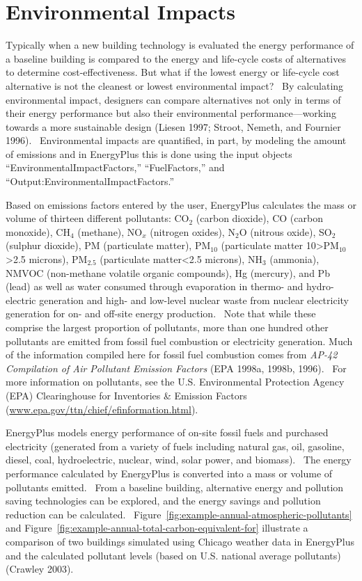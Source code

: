 \section{Environmental Impacts}\label{environmental-impacts}

Typically when a new building technology is evaluated the energy performance of a baseline building is compared to the energy and life-cycle costs of alternatives to determine cost-effectiveness. But what if the lowest energy or life-cycle cost alternative is not the cleanest or lowest environmental impact?~ By calculating environmental impact, designers can compare alternatives not only in terms of their energy performance but also their environmental performance---working towards a more sustainable design (Liesen 1997; Stroot, Nemeth, and Fournier 1996).~ Environmental impacts are quantified, in part, by modeling the amount of emissions and in EnergyPlus this is done using the input objects ``EnvironmentalImpactFactors,'' ``FuelFactors,'' and ``Output:EnvironmentalImpactFactors.''

Based on emissions factors entered by the user, EnergyPlus calculates the mass or volume of thirteen different pollutants: CO\(_{2}\) (carbon dioxide), CO (carbon monoxide), CH\(_{4}\) (methane), NO\(_{x}\) (nitrogen oxides), N\(_{2}\)O (nitrous oxide), SO\(_{2}\) (sulphur dioxide), PM (particulate matter), PM\(_{10}\) (particulate matter 10\textgreater{}PM\(_{10}\)\textgreater{}2.5 microns), PM\(_{2.5}\) (particulate matter\textless{}2.5 microns), NH\(_{3}\) (ammonia), NMVOC (non-methane volatile organic compounds), Hg (mercury), and Pb (lead) as well as water consumed through evaporation in thermo- and hydro-electric generation and high- and low-level nuclear waste from nuclear electricity generation for on- and off-site energy production.~ Note that while these comprise the largest proportion of pollutants, more than one hundred other pollutants are emitted from fossil fuel combustion or electricity generation. Much of the information compiled here for fossil fuel combustion comes from \emph{AP-42 Compilation of Air Pollutant Emission Factors} (EPA 1998a, 1998b, 1996).~ For more information on pollutants, see the U.S. Environmental Protection Agency (EPA) Clearinghouse for Inventories \& Emission Factors (\href{http://www.epa.gov/ttn/chief/efinformation.html}{www.epa.gov/ttn/chief/efinformation.html}).

EnergyPlus models energy performance of on-site fossil fuels and purchased electricity (generated from a variety of fuels including natural gas, oil, gasoline, diesel, coal, hydroelectric, nuclear, wind, solar power, and biomass).~ The energy performance calculated by EnergyPlus is converted into a mass or volume of pollutants emitted.~ From a baseline building, alternative energy and pollution saving technologies can be explored, and the energy savings and pollution reduction can be calculated.~ Figure~\ref{fig:example-annual-atmospheric-pollutants} and Figure~\ref{fig:example-annual-total-carbon-equivalent-for} illustrate a comparison of two buildings simulated using Chicago weather data in EnergyPlus and the calculated pollutant levels (based on U.S. national average pollutants) (Crawley 2003).

